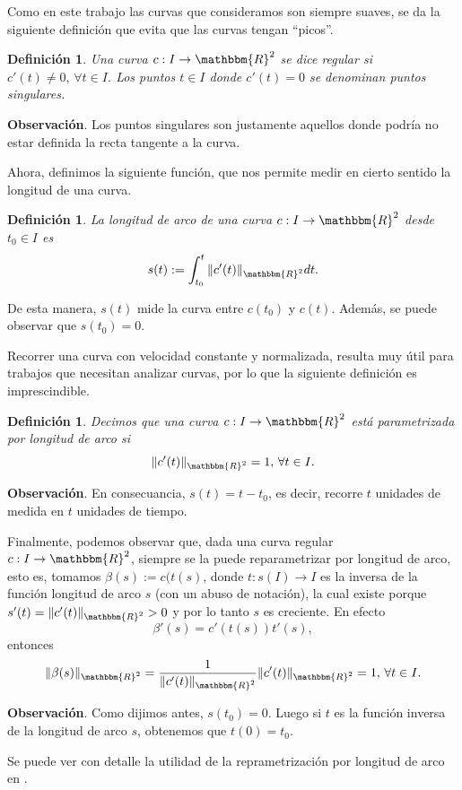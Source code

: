 \documentclass[a4paper,10pt]{book}
\newcommand{\R}{\mathbbm{R}}
\newcommand{\arr}{\rightarrow}
\newtheorem{defi}[teo]{Definici\'on}
\begin{document}
Como en este trabajo las curvas que consideramos son siempre suaves, se da la siguiente definición que evita que las curvas tengan ``picos''.

\begin{defi}
 Una curva $c:I\arr\R^2$ se dice regular si $c'(t)\neq0,\,\forall t\in I$. Los puntos $t\in I$ donde $c'(t)=0$ se denominan puntos singulares.
\end{defi}

\textbf{Observación}. Los puntos singulares son justamente aquellos donde podría no estar definida la recta tangente a la curva.

Ahora, definimos la siguiente función, que nos permite medir en cierto sentido la longitud de una curva.

\begin{defi}
 La longitud de arco de una curva $c:I\arr\R^2$ desde $t_0\in I$ es $$ s(t):=\int_{t_0}^t\|c'(t)\|_{\R^2}dt.$$
\end{defi}
De esta manera, $s(t)$ mide la curva entre $c(t_0)$ y $c(t)$. Además, se puede observar que $s(t_0)=0$.

Recorrer una curva con velocidad constante y normalizada, resulta muy útil para trabajos que necesitan analizar curvas, por lo que la siguiente definición es imprescindible.

\begin{defi}
 Decimos que una curva $c:I\arr\R^2$ está parametrizada por longitud de arco si $$\|c'(t)\|_{\R^2}=1,\,\forall t\in I.$$
\end{defi}

\textbf{Observación}. En consecuancia, $s(t)=t-t_0$, es decir, recorre $t$ unidades de medida en $t$ unidades de tiempo.

Finalmente, podemos observar que, dada una curva regular $c:I\arr\R^2$, siempre se la puede reparametrizar por longitud de arco, esto es, tomamos $\beta(s):=c(t(s)$, donde $t:s(I)\arr I$ es la inversa de la función longitud de arco $s$ (con un abuso de notación), la cual existe porque $s'(t)=\|c'(t)\|_{\R^2}>0$ y por lo tanto $s$ es creciente. En efecto $$\beta'(s)=c'(t(s))t'(s),$$
entonces $$\|\beta(s)\|_{\R^2}=\frac{1}{\|c'(t)\|_{\R^2}}\|c'(t)\|_{\R^2}=1,\,\forall t\in I.$$

\textbf{Observación}. Como dijimos antes, $s(t_0)=0$. Luego si $t$ es la función inversa de la longitud de arco $s$, obtenemos que $t(0)=t_0$.

Se puede ver con detalle la utilidad de la reprametrización por longitud de arco en \cite[Section 1-5.]{do1990geometria}.
\end{document}
